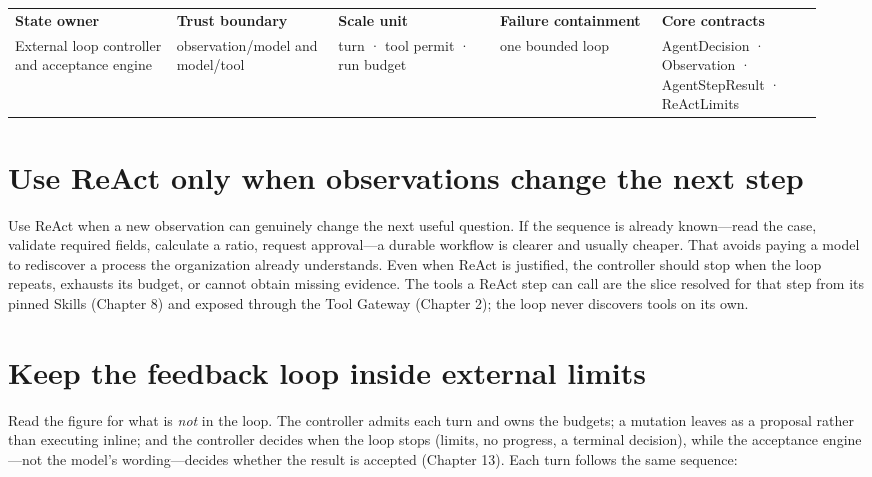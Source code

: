 \BookTableStart
\fontsize{7.2}{9}\selectfont
\begin{tabular}{@{}Y{0.1880\linewidth}Y{0.1880\linewidth}Y{0.1880\linewidth}Y{0.1880\linewidth}Y{0.1880\linewidth}@{}}
\color{white}\bfseries \textbf{State owner} & \color{white}\bfseries \textbf{Trust boundary} & \color{white}\bfseries \textbf{Scale unit} & \color{white}\bfseries \textbf{Failure containment} & \color{white}\bfseries \textbf{Core contracts} \\
External loop controller and acceptance engine & observation/model and model/tool & turn · tool permit · run budget & one bounded loop & AgentDecision · Observation · AgentStepResult · ReActLimits \\
\end{tabular}
\BookTableEnd

\section{Use ReAct only when observations change the next step}

Use ReAct when a new observation can genuinely change the next useful question. If the sequence is already known—read the case, validate required fields, calculate a ratio, request approval—a durable workflow is clearer and usually cheaper. That avoids paying a model to rediscover a process the organization already understands. Even when ReAct is justified, the controller should stop when the loop repeats, exhausts its budget, or cannot obtain missing evidence. The tools a ReAct step can call are the slice resolved for that step from its pinned Skills (Chapter 8) and exposed through the Tool Gateway (Chapter 2); the loop never discovers tools on its own.\par

\section{Keep the feedback loop inside external limits}


Read the figure for what is \emph{not} in the loop. The controller admits each turn and owns the budgets; a mutation leaves as a proposal rather than executing inline; and the controller decides when the loop stops (limits, no progress, a terminal decision), while the acceptance engine—not the model's wording—decides whether the result is accepted (Chapter 13). Each turn follows the same sequence:\par

